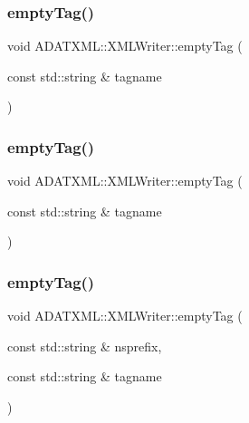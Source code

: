 \subsubsection{\texorpdfstring{emptyTag()}{emptyTag()}\hspace{0.1cm}{\footnotesize\ttfamily [1/8]}}
{\footnotesize\ttfamily void A\+D\+A\+T\+X\+M\+L\+::\+X\+M\+L\+Writer\+::empty\+Tag (\begin{DoxyParamCaption}\item[{const std\+::string \&}]{tagname }\end{DoxyParamCaption})}

\mbox{\label{classADATXML_1_1XMLWriter_a7749a56b9e15992d3168f808b2ad02c5}} 
\subsubsection{\texorpdfstring{emptyTag()}{emptyTag()}\hspace{0.1cm}{\footnotesize\ttfamily [2/8]}}
{\footnotesize\ttfamily void A\+D\+A\+T\+X\+M\+L\+::\+X\+M\+L\+Writer\+::empty\+Tag (\begin{DoxyParamCaption}\item[{const std\+::string \&}]{tagname }\end{DoxyParamCaption})}

\mbox{\label{classADATXML_1_1XMLWriter_a7941500f8d733594745588b65ff4789c}} 
\subsubsection{\texorpdfstring{emptyTag()}{emptyTag()}\hspace{0.1cm}{\footnotesize\ttfamily [3/8]}}
{\footnotesize\ttfamily void A\+D\+A\+T\+X\+M\+L\+::\+X\+M\+L\+Writer\+::empty\+Tag (\begin{DoxyParamCaption}\item[{const std\+::string \&}]{nsprefix,  }\item[{const std\+::string \&}]{tagname }\end{DoxyParamCaption})}

\mbox{\label{classADATXML_1_1XMLWriter_a7941500f8d733594745588b65ff4789c}} 

